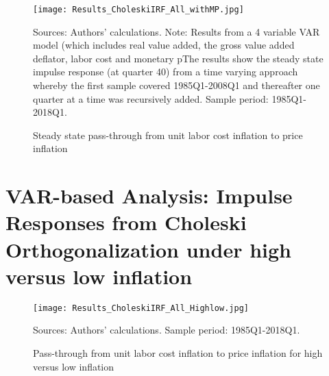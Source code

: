 \documentclass[11pt]{article}
\begin{document}
\begin{appendices}
\begin{figure}[!htbp]
\begin{center}
\caption{Steady state pass-through from unit labor cost inflation to price inflation}\label{fig:TVP_Choleski_MP}
\texttt{[image: Results\_CholeskiIRF\_All\_withMP.jpg]}
\begin{minipage}{\textwidth} {\footnotesize
Sources: Authors' calculations.
Note: Results from a 4 variable VAR model (which includes real value added, the gross value added deflator, labor cost and monetary pThe results show the steady state impulse response (at quarter 40) from a time varying approach whereby the first sample covered 1985Q1-2008Q1 and thereafter one quarter at a time was recursively added. 
Sample period: 1985Q1-2018Q1.\par}
\end{minipage}
\end{center}
\end{figure}

\clearpage

\section{VAR-based Analysis: Impulse Responses from Choleski Orthogonalization under high versus low inflation}
\label{AppendixCholeskiCountriesHighLow}


\begin{figure}[!htbp]
\begin{center}
\caption{Pass-through from unit labor cost inflation to price inflation for high versus low inflation}\label{fig:all_choleski_highlow}
\texttt{[image: Results\_CholeskiIRF\_All\_Highlow.jpg]}
\begin{minipage}{\textwidth} {\footnotesize
Sources: Authors' calculations.
Sample period: 1985Q1-2018Q1.\par}
\end{minipage}
\end{center}
\end{figure}






\end{appendices}
\end{document}
